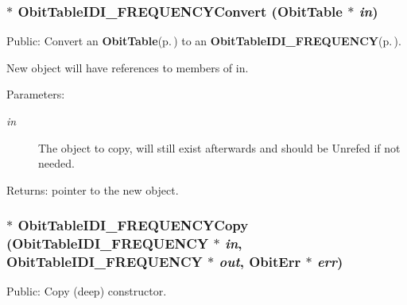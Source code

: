 \subsubsection{$\ast$ Obit\-Table\-IDI\_\-FREQUENCYConvert ({\bf Obit\-Table} $\ast$ {\em in})}\label{ObitTableIDI__FREQUENCY_8c_a19}


Public: Convert an {\bf Obit\-Table}{\rm (p.\,\pageref{structObitTable})} to an {\bf Obit\-Table\-IDI\_\-FREQUENCY}{\rm (p.\,\pageref{structObitTableIDI__FREQUENCY})}. 

New object will have references to members of in. \begin{Desc}
\item[Parameters:]
\begin{description}
\item[{\em in}]The object to copy, will still exist afterwards and should be Unrefed if not needed. \end{description}
\end{Desc}
\begin{Desc}
\item[Returns:]pointer to the new object. \end{Desc}
\subsubsection{$\ast$ Obit\-Table\-IDI\_\-FREQUENCYCopy ({\bf Obit\-Table\-IDI\_\-FREQUENCY} $\ast$ {\em in}, {\bf Obit\-Table\-IDI\_\-FREQUENCY} $\ast$ {\em out}, {\bf Obit\-Err} $\ast$ {\em err})}\label{ObitTableIDI__FREQUENCY_8c_a20}


Public: Copy (deep) constructor. 


